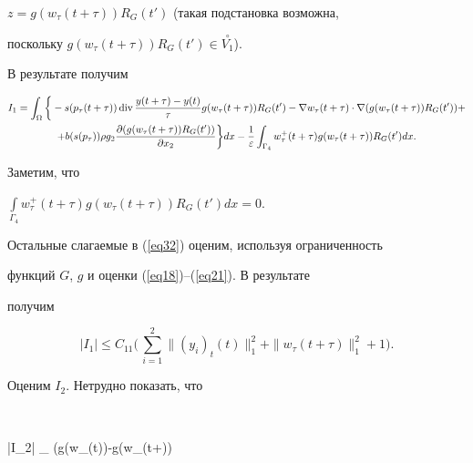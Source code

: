$z=g(w_{\tau}(t+\tau))R_{G}(t')$ (такая подстановка возможна,


поскольку $g(w_{\tau}(t+\tau))R_{G}(t') \in \overset{\circ}{V_{1}}$).


В результате получим


\begin{multline}


\label{eq32}


I_{1}= \int_{\Omega}


\bigg \{- s(p_{\tau}(t+\tau)) \Div \frac


{y(t+\tau) - y(t)}{\tau} g(w_{\tau}(t+\tau)) R_{G}(t') -


\nabla w_{\tau}(t+\tau) \cdot \nabla (g(w_{\tau}(t+\tau)) R_{G}(t')) + \\


%


+ b (s(p_{\tau})) \rho g_{2}


\frac{\partial (g(w_{\tau}(t+\tau))R_{G}(t'))}{\partial x_{2}} \bigg\}dx-


\frac{1}{\varepsilon} \int_{\Gamma_{4}} 


w_{\tau}^{+}(t+\tau) g(w_{\tau}(t+\tau))R_{G}(t') dx.


\end{multline}


Заметим, что


$\int\limits_{\Gamma_{4}} w_{\tau}^{+}(t+\tau) g(w_{\tau}(t+\tau))


R_{G}(t') dx =0$.


Остальные слагаемые в (\ref{eq32}) оценим, используя ограниченность


функций $G$, $g$ и оценки (\ref{eq18})--(\ref{eq21}). В результате


получим


\begin{equation}


|I_{1}| \leq C_{11} \bigg(\,\sum_{i=1}^{2} \| (y_{i})_{t}(t) \|_{1}^{2} +


\|w_{\tau}(t+\tau) \|_{1}^{2}+1 \bigg).


\label{eq33}


\end{equation}


Оценим $I_{2}$. Нетрудно показать, что


$$


|I_{2}| \leq \int_{\Omega}  \bigg(g(w_{\tau}(t))-g(w_{\tau}(t+\tau))


